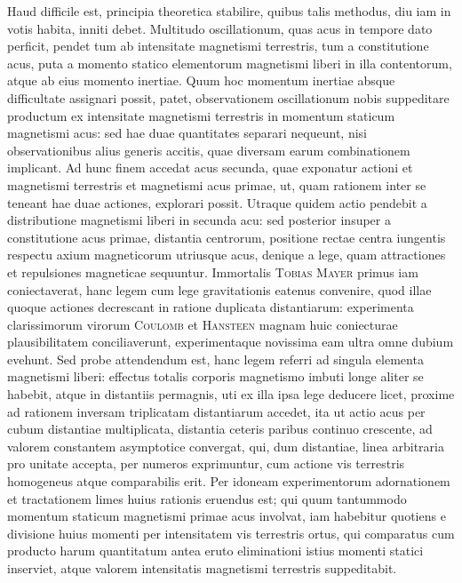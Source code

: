 Haud difficile est, principia theoretica stabilire, quibus talis methodus, diu iam in votis habita, inniti debet. Multitudo oscillationum, quas acus in tempore dato perficit, pendet tum ab intensitate magnetismi terrestris, tum a constitutione acus, puta a momento statico elementorum magnetismi liberi in illa contentorum, atque ab eius momento inertiae. Quum hoc momentum inertiae absque difficultate assignari possit, patet, observationem oscillationum nobis suppeditare productum ex intensitate magnetismi terrestris in momentum staticum magnetismi acus: sed hae duae quantitates separari nequeunt, nisi observationibus alius generis accitis, quae diversam earum combinationem implicant. Ad hunc finem accedat acus secunda, quae exponatur actioni et magnetismi terrestris et magnetismi acus primae, ut, quam rationem inter se teneant hae duae actiones, explorari possit. Utraque quidem actio pendebit a distributione magnetismi liberi in secunda acu: sed posterior insuper a constitutione acus primae, distantia centrorum, positione rectae centra iungentis respectu axium magneticorum utriusque acus, denique a lege, quam attractiones et repulsiones magneticae sequuntur. Immortalis \textsc{Tobias Mayer} primus iam coniectaverat, hanc legem cum lege gravitationis eatenus convenire, quod illae quoque actiones decrescant in ratione duplicata distantiarum: experimenta clarissimorum virorum \textsc{Coulomb} et \textsc{Hansteen} magnam huic coniecturae plausibilitatem conciliaverunt, experimentaque novissima eam ultra omne dubium evehunt. Sed probe attendendum est, hanc legem referri ad singula elementa magnetismi liberi: effectus totalis corporis magnetismo imbuti longe aliter se habebit, atque in distantiis permagnis, uti ex illa ipsa lege deducere licet, proxime ad rationem inversam triplicatam distantiarum accedet, ita ut actio acus per cubum distantiae multiplicata, distantia ceteris paribus continuo crescente, ad valorem constantem asymptotice convergat, qui, dum distantiae, linea arbitraria pro unitate accepta, per numeros exprimuntur, cum actione vis terrestris homogeneus atque comparabilis erit. Per idoneam experimentorum adornationem et tractationem limes huius rationis eruendus est; qui quum tantummodo momentum staticum magnetismi primae acus involvat, iam habebitur quotiens e divisione huius momenti per intensitatem vis terrestris ortus, qui comparatus cum producto harum quantitatum antea eruto eliminationi istius momenti statici inserviet, atque valorem intensitatis magnetismi terrestris suppeditabit.

